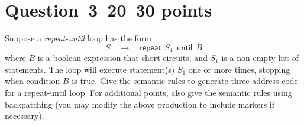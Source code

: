 \documentclass[10pt]{article}
\begin{document}
\section*{Question~3~\hfill 20--30 points}
Suppose a \emph{repeat-until} loop
has the form
\[
  S \quad \rightarrow \quad \mathsf{repeat} ~~ S_1 ~~\mathsf{until} ~~ B
\]
where $B$ is a boolean expression that short circuits,
and $S_1$ is a non-empty list of statements.
The loop will execute statement(s) $S_1$ one or more times,
stopping when condition $B$ is true.
Give the semantic rules to generate three-address code for a repeat-until loop.
For additional points, also give the semantic rules using backpatching
(you may modify the above production to include markers if necessary).
\end{document}
